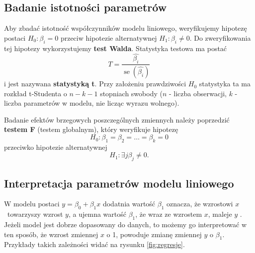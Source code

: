 \documentclass[12pt]{mwbk}
\theoremstyle{plain}
\theoremstyle{definition}
\theoremstyle{definition}
\begin{document}
\subsection{Badanie istotności parametrów}

Aby zbadać istotność współczynników modelu liniowego, weryfikujemy hipotezę postaci $H_0: \beta_i = 0$ przeciw hipotezie alternatywnej $H_1: \beta_i \neq 0.																																																																																																																																																																																																																																																																																																																																																																																																																																																																																																																													$ Do zweryfikowania tej hipotezy wykorzystujemy \textbf{test Walda}. Statystyka testowa ma postać $$T=\frac{\hat{\beta_i}}{\operatorname{se}(\hat{\beta_i})}$$ i jest nazywana \textbf{statystyką t}. Przy założeniu prawdziwości $H_0$ statystyka ta ma rozkład t-Studenta o $n-k-1$ stopniach swobody ($n$ - liczba obserwacji, $k$ - liczba parametrów w modelu, nie licząc wyrazu wolnego).

Badanie efektów brzegowych poszczególnych zmiennych należy poprzedzić \textbf{testem F} (testem globalnym), który weryfikuje hipotezę $$H_0: \beta_1=\beta_2=\ldots=\beta_k=0$$
 przeciwko hipotezie alternatywnej $$H_1: \exists{j} \beta_j \neq 0.$$

\subsection{Interpretacja parametrów modelu liniowego}

W modelu postaci $y=\beta_0 +\beta_1 x$ dodatnia wartość $\beta_1$ oznacza, że wzrostowi $x$~towarzyszy wzrost $y$, a ujemna wartość $\beta_1$, że wraz ze wzrostem $x$, maleje $y$ \cite{rozrzut}. Jeżeli model jest dobrze dopasowany do danych, to możemy go interpretować w ten sposób, że wzrost zmiennej $x$ o 1, powoduje zmianę zmiennej $y$ o $\beta_1$. Przykłady takich zależności widać na rysunku \ref{fig:regresje}.
\end{document}
